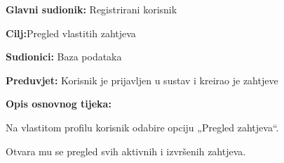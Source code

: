 \noindent {}
\begin{packed_item}
	\item \textbf{Glavni sudionik: }Registrirani korisnik
	\item  \textbf{Cilj:}Pregled vlastitih zahtjeva
	\item  \textbf{Sudionici:} Baza podataka
	\item  \textbf{Preduvjet:} Korisnik je prijavljen u sustav i kreirao je zahtjeve
	\item  \textbf{Opis osnovnog tijeka:}
	\item[] \begin{packed_enum}
		\item Na vlastitom profilu korisnik odabire opciju „Pregled zahtjeva“.
		\item 	Otvara mu se pregled svih aktivnih i izvršenih zahtjeva.
	\end{packed_enum}
\end{packed_item}


